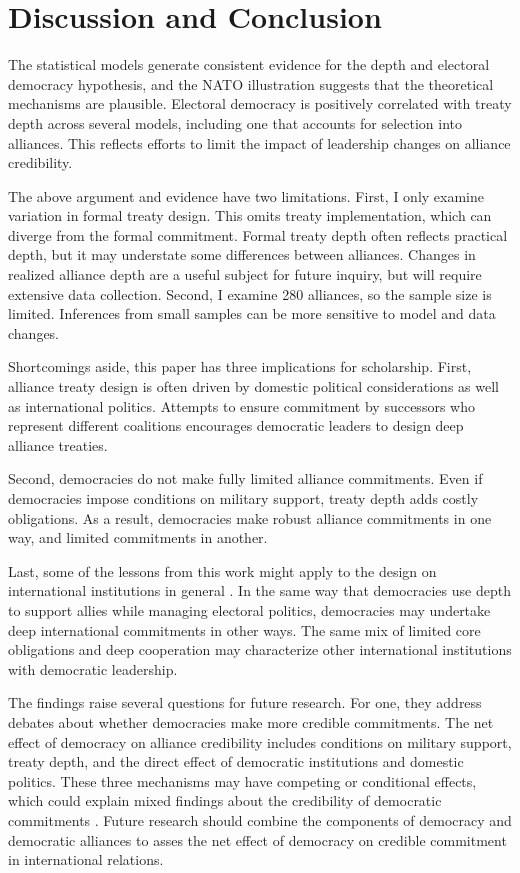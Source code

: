 \documentclass[12pt]{article}
\begin{document}
\section{Discussion and Conclusion} 


The statistical models generate consistent evidence for the depth and electoral democracy hypothesis, and the NATO illustration suggests that the theoretical mechanisms are plausible. 
Electoral democracy is positively correlated with treaty depth across several models, including one that accounts for selection into alliances. 
This reflects efforts to limit the impact of leadership changes on alliance credibility. 


The above argument and evidence have two limitations.
First, I only examine variation in formal treaty design. 
This omits treaty implementation, which can diverge from the formal commitment.   
Formal treaty depth often reflects practical depth, but it may understate some differences between alliances. 
Changes in realized alliance depth are a useful subject for future inquiry, but will require extensive data collection.
Second, I examine 280 alliances, so the sample size is limited. 
Inferences from small samples can be more sensitive to model and data changes. 


Shortcomings aside, this paper has three implications for scholarship. 
First, alliance treaty design is often driven by domestic political considerations as well as international politics. 
Attempts to ensure commitment by successors who represent different coalitions encourages democratic leaders to design deep alliance treaties. 

Second, democracies do not make fully limited alliance commitments.
Even if democracies impose conditions on military support, treaty depth adds costly obligations.
As a result, democracies make robust alliance commitments in one way, and limited commitments in another. 


Last, some of the lessons from this work might apply to the design on international institutions in general \citep{DownesRocke1995, MartinSimmons1998, Koremenosetal2001, Thompson2010}.
In the same way that democracies use depth to support allies while managing electoral politics, democracies may undertake deep international commitments in other ways. 
The same mix of limited core obligations and deep cooperation may characterize other international institutions with democratic leadership. 


The findings raise several questions for future research.  
For one, they address debates about whether democracies make more credible commitments. 
The net effect of democracy on alliance credibility includes conditions on military support, treaty depth, and the direct effect of democratic institutions and domestic politics. 
These three mechanisms may have competing or conditional effects, which could explain mixed findings about the credibility of democratic commitments \citep{Schultz1999, Leeds1999, Thyne2012, DownesSechser2012, PotterBaum2014}.
Future research should combine the components of democracy and democratic alliances to asses the net effect of democracy on credible commitment in international relations. 
\end{document}
